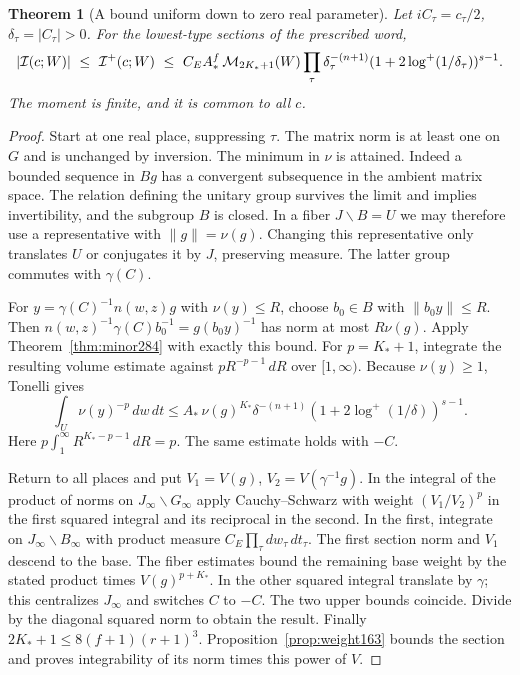 \documentclass[a4paper,11pt]{article}
\newtheorem{theorem}[proposition]{Theorem}
\theoremstyle{definition}
\theoremstyle{remark}
\numberwithin{equation}{section}
\begin{document}
\begin{theorem}[A bound uniform down to zero real parameter]\leavevmode
\label{thm:norm284}
Let \(iC_\tau=c_\tau/2\), \(\delta_\tau=|C_\tau|>0\).
For the lowest-type sections of the prescribed word,
\[
 |\mathcal I(c;W)|\ \le\ \mathcal I^+(c;W)
 \ \le\ C_E A_*^f\,{\cal M}_{2K_*+1}(W)
      \prod_\tau\delta_\tau^{-(n+1)}
               (1+2\log^+(1/\delta_\tau))^{s-1}.
\]
The moment is finite, and it is common to all \(c\).
\end{theorem}
\begin{proof}
Start at one real place, suppressing \(\tau\).
The matrix norm is at least one on \(G\) and is unchanged by
inversion. The minimum in \(\nu\) is attained. Indeed a
bounded sequence in \(Bg\) has a convergent subsequence in
the ambient matrix space. The relation defining the unitary
group survives the limit and implies invertibility, and the
subgroup \(B\) is closed. In a fiber \(J\backslash B=U\)
we may therefore use a representative with \(\|g\|=\nu(g)\).
Changing this representative only translates \(U\) or
conjugates it by \(J\), preserving measure. The latter
group commutes with \(\gamma(C)\).

For \(y=\gamma(C)^{-1}n(w,z)g\) with \(\nu(y)\le R\), choose
\(b_0\in B\) with \(\|b_0y\|\le R\). Then
\(n(w,z)^{-1}\gamma(C)b_0^{-1}=g(b_0y)^{-1}\)
has norm at most \(R\nu(g)\). Apply
Theorem~\ref{thm:minor284} with exactly this bound.
For \(p=K_*+1\), integrate the resulting volume estimate
against \(pR^{-p-1}\,dR\) over \([1,\infty)\).
Because \(\nu(y)\ge1\), Tonelli gives
\[
 \int_U \nu(y)^{-p}\,dw\,dt
   \le A_*\,\nu(g)^{K_*}\delta^{-(n+1)}
                           (1+2\log^+(1/\delta))^{s-1}.
\]
Here \(p\int_1^\infty R^{K_*-p-1}\,dR=p\).
The same estimate holds with \(-C\).

Return to all places and put \(V_1=V(g)\),
\(V_2=V(\gamma^{-1}g)\). In the integral of the product
of norms on \(J_\infty\backslash G_\infty\) apply
Cauchy--Schwarz with weight \((V_1/V_2)^p\) in the
first squared integral and its reciprocal in the second.
In the first, integrate on \(J_\infty\backslash B_\infty\)
with product measure \(C_E\prod_\tau dw_\tau\,dt_\tau\).
The first section norm and \(V_1\) descend to the base.
The fiber estimates bound the remaining base weight by the
stated product times \(V(g)^{p+K_*}\).
In the other squared integral translate by \(\gamma\);
this centralizes \(J_\infty\) and switches \(C\) to \(-C\).
The two upper bounds coincide. Divide by the diagonal
squared norm to obtain the result. Finally
\(2K_*+1\le 8(f+1)(r+1)^3\). Proposition~\ref{prop:weight163}
bounds the section and proves integrability of its norm
times this power of \(V\).
\end{proof}
\end{document}

